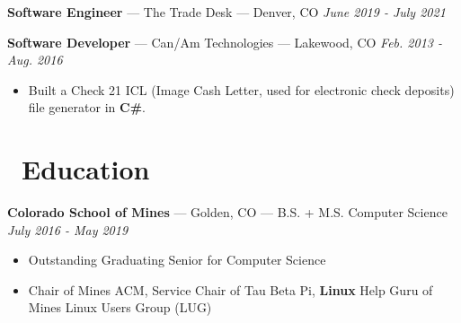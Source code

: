 \documentclass[10pt,letterpaper]{article}
\begin{document}
\vspace{3pt}
{\fontsize{11}{0}
\textbf{Software Engineer} --- The Trade Desk --- Denver, CO}
\hfill \textit{June 2019 - July 2021}




\vspace{3pt}
{\fontsize{11}{0}
\textbf{Software Developer} --- Can/Am Technologies --- Lakewood, CO}
\hfill \textit{Feb. 2013 - Aug. 2016}
\begin{itemize}
    \item Built a Check 21 ICL (Image Cash Letter, used for electronic check
        deposits) file generator in \textbf{C\#}.
\end{itemize}


\section*{\faBook\ Education}
{\fontsize{11}{0}
\textbf{Colorado School of Mines} --- Golden, CO --- B.S. + M.S. Computer Science}
\hfill \textit{July 2016 - May 2019}
\begin{itemize}
    \item Outstanding Graduating Senior for Computer Science
    \item Chair of Mines ACM, Service Chair of Tau Beta Pi, \textbf{Linux} Help
        Guru of Mines Linux Users Group (LUG)
\end{itemize}
\end{document}
